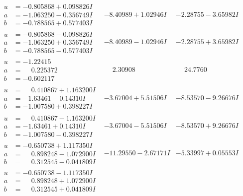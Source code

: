 \documentclass[1p]{elsarticle_modified}
\theoremstyle{definition}
\begin{document}
$$\begin{array}{c|c|c}
\begin{aligned}
u &= -0.805868 + 0.098826 I \\
a &= -1.063250 - 0.356749 I \\
b &= -0.788565 + 0.577403 I\end{aligned}
 & -8.40989 + 1.02946 I & -2.28755 - 3.65982 I \\ \hline\begin{aligned}
u &= -0.805868 - 0.098826 I \\
a &= -1.063250 + 0.356749 I \\
b &= -0.788565 - 0.577403 I\end{aligned}
 & -8.40989 - 1.02946 I & -2.28755 + 3.65982 I \\ \hline\begin{aligned}
u &= -1.22415\phantom{ +0.000000I} \\
a &= \phantom{-}0.225372\phantom{ +0.000000I} \\
b &= -0.602117\phantom{ +0.000000I}\end{aligned}
 & \phantom{-}2.30908\phantom{ +0.000000I} & \phantom{-}24.7760\phantom{ +0.000000I} \\ \hline\begin{aligned}
u &= \phantom{-}0.410867 + 1.163200 I \\
a &= -1.63461 - 0.14310 I \\
b &= -1.007580 + 0.398227 I\end{aligned}
 & -3.67004 + 5.51506 I & -8.53570 - 9.26676 I \\ \hline\begin{aligned}
u &= \phantom{-}0.410867 - 1.163200 I \\
a &= -1.63461 + 0.14310 I \\
b &= -1.007580 - 0.398227 I\end{aligned}
 & -3.67004 - 5.51506 I & -8.53570 + 9.26676 I \\ \hline\begin{aligned}
u &= -0.650738 + 1.117350 I \\
a &= \phantom{-}0.898248 - 1.072900 I \\
b &= \phantom{-}0.312545 - 0.041809 I\end{aligned}
 & -11.29550 - 2.67171 I & -5.33997 + 0.05553 I \\ \hline\begin{aligned}
u &= -0.650738 - 1.117350 I \\
a &= \phantom{-}0.898248 + 1.072900 I \\
b &= \phantom{-}0.312545 + 0.041809 I\end{aligned}

\end{array}$$
\end{document}
